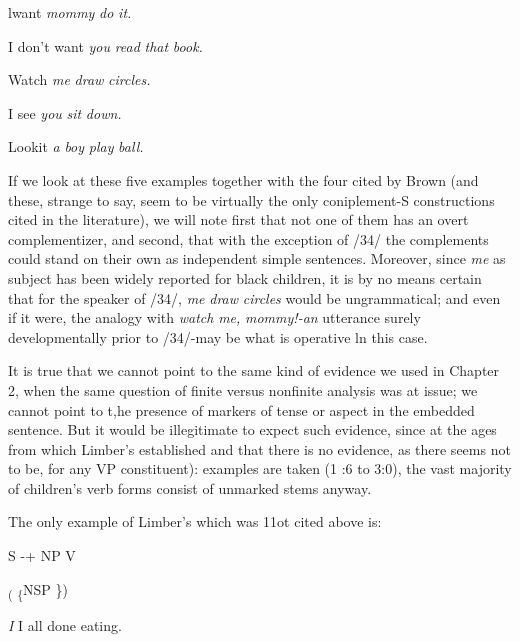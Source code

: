 \ea\label{ex:32}
 lwant \textit{mommy} \textit{do} \textit{it.}
\glt
\z

\ea\label{ex:33}
 I don't want \textit{you} \textit{read} \textit{that} \textit{book.}
\glt
\z


\ea\label{ex:34}
 Watch \textit{me} \textit{draw} \textit{circles.}
\glt
\z

\ea\label{ex:35}
 I see \textit{you} \textit{sit} \textit{down.}
\glt
\z

\ea\label{ex:36}
 Lookit \textit{a} \textit{boy} \textit{play} \textit{ball.}
\glt
\z

If we look at these five examples together with the four cited by Brown (and these, strange to say, seem to be virtually the only coniplement-S constructions cited in the literature), we will note first that not one of them has an overt complementizer, and second,
that with the exception of /34/ the complements could stand on their own as independent simple sentences. Moreover, since \textit{me} as subject
has been widely reported for black children, it is by no means certain that for the speaker of /34/, \textit{me} \textit{draw} \textit{circles} would be ungrammatical; and even if it were, the analogy with \textit{watch} \textit{me,} \textit{mommy!-an} utterance surely developmentally prior to /34/-may be what is operative ln this case.

It is true that we cannot point to the same kind of evidence
we used in Chapter 2, when the same question of finite versus non\-finite analysis was at issue; we cannot point to t,he presence of markers of tense or aspect in the embedded sentence. But it would be illegiti\-mate to expect such evidence, since at the ages from which Limber's
established and that there is no evidence, as there seems not to be, for any VP constituent):
examples are taken (1 :6 to 3:0), the vast majority of children's verb forms consist of unmarked stems anyway.

The only example of Limber's which was 11ot cited above is:

\ea\label{ex:39}
 S {}-+ NP V
\glt
\z

\textsubscript{( }\textsubscript{\{}NSP \})

\ea\label{ex:37}
\textit{I} I all done eating.
\glt
\z

